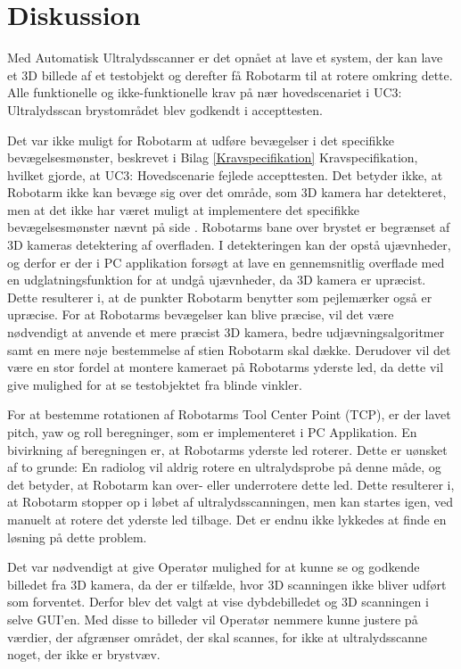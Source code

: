 \chapter{Diskussion}\label{kapitel_Diskussion}
Med Automatisk Ultralydsscanner er det opnået at lave et system, der kan lave et 3D billede af et testobjekt og derefter få Robotarm til at rotere omkring dette. Alle funktionelle og ikke-funktionelle krav på nær hovedscenariet i UC3: Ultralydsscan brystområdet blev godkendt i accepttesten. 

Det var ikke muligt for Robotarm at udføre bevægelser i det specifikke bevægelsesmønster, beskrevet i Bilag \ref{Kravspecifikation} Kravspecifikation, hvilket gjorde, at UC3: Hovedscenarie fejlede accepttesten. Det betyder ikke, at Robotarm ikke kan bevæge sig over det område, som 3D kamera har detekteret, men at det ikke har været muligt at implementere det specifikke bevægelsesmønster nævnt på side \pageref{Probensbevagelse}. Robotarms bane over brystet er begrænset af 3D kameras detektering af overfladen. I detekteringen kan der opstå ujævnheder, og derfor er der i PC applikation forsøgt at lave en gennemsnitlig overflade med en udglatningsfunktion for at undgå ujævnheder, da 3D kamera er upræcist. Dette resulterer i, at de punkter Robotarm benytter som pejlemærker også er upræcise. For at Robotarms bevægelser kan blive præcise, vil det være nødvendigt at anvende et mere præcist 3D kamera, bedre udjævningsalgoritmer samt en mere nøje bestemmelse af stien Robotarm skal dække. Derudover vil det være en stor fordel at montere kameraet på Robotarms yderste led, da dette vil give mulighed for at se testobjektet fra blinde vinkler. 

For at bestemme rotationen af Robotarms Tool Center Point (TCP), er der lavet pitch, yaw og roll beregninger, som er implementeret i PC Applikation. En bivirkning af beregningen er, at Robotarms yderste led roterer. Dette er uønsket af to grunde: En radiolog vil aldrig rotere en ultralydsprobe på denne måde, og det betyder, at Robotarm kan over- eller underrotere dette led. Dette resulterer i, at Robotarm stopper op i løbet af ultralydsscanningen, men kan startes igen, ved manuelt at rotere det yderste led tilbage. Det er endnu ikke lykkedes at finde en løsning på dette problem.

Det var nødvendigt at give Operatør mulighed for at kunne se og godkende billedet fra 3D kamera, da der er tilfælde, hvor 3D scanningen ikke bliver udført som forventet. Derfor blev det valgt at vise dybdebilledet og 3D scanningen i selve GUI'en. Med disse to billeder vil Operatør nemmere kunne justere på værdier, der afgrænser området, der skal scannes, for ikke at ultralydsscanne noget, der ikke er brystvæv.

